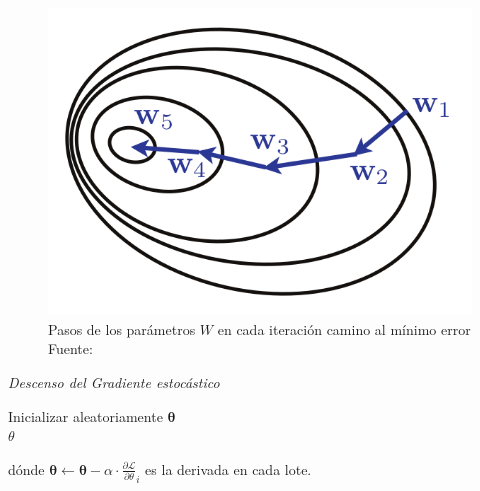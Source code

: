         \begin{figure}[H]
            \centering
            \includegraphics[scale=0.3]{imagenes/sgd}
            \caption{Pasos de los parámetros $W$ en cada iteración camino al mínimo error\\ Fuente: \citep{10.5555/3360093}}
        \end{figure}
        {
        \begin{algorithm}[H]
        	\caption{\textit{Descenso del Gradiente estocástico}}
        	\SetAlgoLined
        	Inicializar aleatoriamente $\mathbf{\theta}$\\
        	\Return $\theta$
        \end{algorithm}
        }
        
        \noindent dónde $\mathbf{\theta} \leftarrow \mathbf{\theta} - \alpha\cdot \frac{\partial\mathcal{L}}{\partial \theta}_i$ es la derivada en cada lote.
